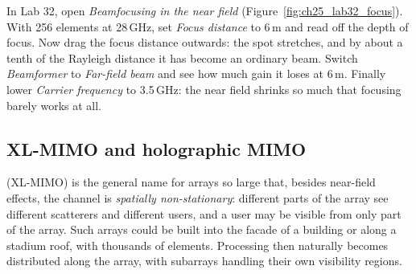 
\begin{tryit}
In Lab 32, open \emph{Beamfocusing in the near field} (Figure~\ref{fig:ch25_lab32_focus}). With 256
elements at 28\,GHz, set \emph{Focus distance} to 6\,m and read off the depth of focus. Now drag the
focus distance outwards: the spot stretches, and by about a tenth of the Rayleigh distance it has
become an ordinary beam. Switch \emph{Beamformer} to \emph{Far-field beam} and see how much gain it
loses at 6\,m. Finally lower \emph{Carrier frequency} to 3.5\,GHz: the near field shrinks so much that
focusing barely works at all.
\end{tryit}


\subsection{XL-MIMO and holographic MIMO}

 (XL-MIMO) is the general name for arrays so large that, besides
near-field effects, the channel is \emph{spatially non-stationary}: different parts of the array see
different scatterers and different users, and a user may be visible from only part of the array.
Such arrays could be built into the facade of a building or along a stadium roof, with thousands of
elements. Processing then naturally becomes distributed along the array, with subarrays handling
their own visibility regions.

